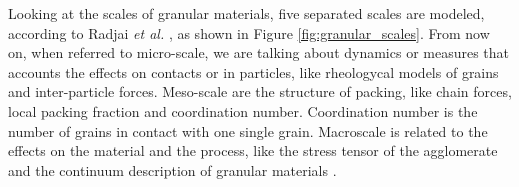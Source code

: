 



    


    Looking at the scales of granular materials, five separated scales are modeled, according to Radjai \textit{et al.} \cite{Modeling_Granular_Materials}, as shown in Figure \ref{fig:granular_scales}. From now on, when referred to micro-scale, we are talking about dynamics or measures that accounts the effects on contacts or in particles, like rheologycal models of grains and inter-particle forces. Meso-scale are the structure of packing, like chain forces, local packing fraction and coordination number. Coordination number is the number of grains in contact with one single grain. Macroscale is related to the effects on the material and the process, like the stress tensor of the agglomerate and the continuum description of granular materials \cite{Modeling_Granular_Materials}.

